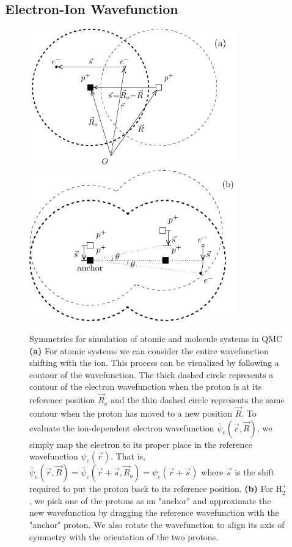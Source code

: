 \documentclass[pra,superscriptaddress,groupedaddress,twocolumn]{revtex4}
\begin{document}
\subsection{Electron-Ion Wavefunction}

\begin{figure}[t]
\includegraphics[width=9cm]{fig1a.pdf}
\includegraphics[width=9cm]{fig1b.pdf}
\caption{ Symmetries for simulation of atomic and molecule systems in QMC {\bf (a)} For atomic systems we can consider the entire wavefunction shifting with the ion. This process can be visualized by following a contour of the wavefunction. The thick dashed circle represents a contour of the electron wavefunction when the proton is at its reference position $\vec{R}_o$ and the thin dashed circle represents the same contour when the proton has moved to a new position $\vec{R}$. To evaluate the ion-dependent electron wavefunction $\bar{\psi}_e(\vec{r},\vec{R})$, we simply map the electron to its proper place in the reference wavefunction $\psi_e(\vec{r})$. That is, $\bar{\psi}_e(\vec{r},\vec{R})=\bar{\psi}_e(\vec{r}+\vec{s},\vec{R}_o)=\psi_e(\vec{r}+\vec{s})$ where $\vec{s}$ is the shift required to put the proton back to its reference position. {\bf (b)} For H$_2^+$, we pick one of the protons as an "anchor" and approximate the new wavefunction by dragging the reference wavefunction with the "anchor" proton. We also rotate the wavefunction to align its axis of symmetry with the orientation of the two protons. \label{fig:drag}}
\end{figure}
\end{document}
